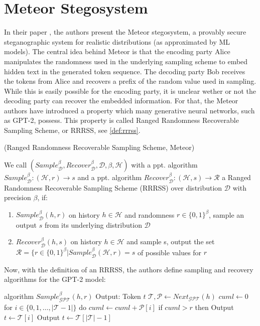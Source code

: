 \documentclass[english,version-2020-11]{uzl-thesis}
\begin{document}
\section{Meteor Stegosystem}

In their paper \cite{Meteor2020}, the authors present the Meteor stegosystem, a provably secure steganographic system for realistic distributions (as approximated by ML models).
The central idea behind Meteor is that the encoding party Alice manipulates the randomness used in the underlying sampling scheme to embed hidden text in the generated token sequence.
The decoding party Bob receives the tokens from Alice and recovers a prefix of the random value used in sampling.
While this is easily possible for the encoding party, it is unclear wether or not the decoding party can recover the embedded information.
For that, the Meteor authors have introduced a property which many generative neural networks, such as GPT-2, possess.
This property is called Ranged Randomness Recoverable Sampling Scheme, or RRRSS, see \autoref{def:rrrss}.

\begin{definition}
	(Ranged Randomness Recoverable Sampling Scheme, Meteor) 
	
	We call 
	$(Sample_{\mathcal{D}}^\beta, Recover_{\mathcal{D}}^\beta, \mathcal{D}, \beta, \mathcal{H})$ 
	with a ppt. algorithm 
	$Sample_{\mathcal{D}}^\beta \colon (\mathcal{H}, r) \rightarrow s$ 
	and a ppt. algorithm 
	$Recover_{\mathcal{D}}^\beta \colon (\mathcal{H}, s) \rightarrow \mathcal{R}$ 
	a Ranged Randomness Recoverable Sampling Scheme (RRRSS) over distribution $\mathcal{D}$ with precision $\beta$, if:
	
	\begin{enumerate}
		\item $Sample_{\mathcal{D}}^\beta(h, r)$ on history $h \in \mathcal{H}$ and randomness $r \in \{0,1\}^\beta$, sample an output $s$ from its underlying distribution $\mathcal{D}$
		\item $Recover_{\mathcal{D}}^\beta(h, s)$ on history $h \in \mathcal{H}$ and sample s, output the set $\mathcal{R} = \{ r \in \{0,1\}^\beta | Sample_{\mathcal{D}}^\beta(\mathcal{H}, r) = s$ of possible values for $r$
	\end{enumerate}
	\label{def:rrrss}
\end{definition}

Now, with the definition of an RRRSS, the authors define sampling and recovery algorithms for the GPT-2 model:

\begin{Pseudocode}
algorithm $Sample_{\mathcal{GPT}}^\beta(	h, r)$
	Output: Token $t$
	$\mathcal{T}, \mathcal{P} \leftarrow Next_{\mathcal{GPT}}(h)$
	$cuml \leftarrow 0$
	for $i \in \{ 0, 1, \dots, | \mathcal{T} - 1 | \}$ do
		$cuml \leftarrow cuml + \mathcal{P}[i]$
		if $cuml > r$ then
			Output $t \leftarrow \mathcal{T}[i]$
	Output $t \leftarrow \mathcal{T}[|\mathcal{T}|-1]$
\end{Pseudocode}
\end{document}
